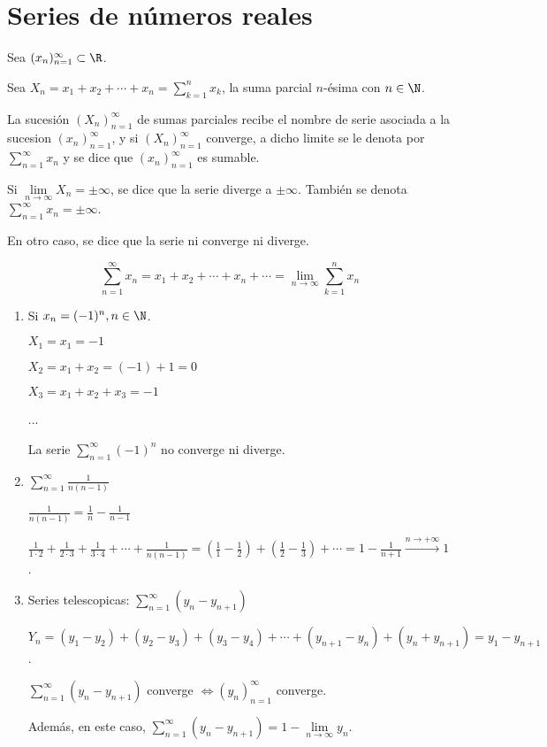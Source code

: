 \section{Series de números reales}
\begin{definition}[Serie]
	Sea \((x_n)^{\infty}_{n=1} \subset \R \). 
	
	Sea \(X_n = x_1 + x_2 + \cdots + x_n = \sum_{k =1}^{n } x_k \), la suma parcial \(n\)-ésima con \(n \in \N \).
	
	La sucesión \((X_n)^{\infty}_{n=1} \) de sumas parciales recibe el nombre de serie asociada a la sucesion \((x_n)^{\infty}_{n=1} \), y si \((X_n)^{\infty}_{n=1} \) converge, a dicho limite se le denota por \(\sum_{n =1}^{\infty} x_n \) y se dice que \((x_n)^{\infty}_{n=1} \) es sumable. 
	
	Si \(\lim\limits_{n \to \infty} X_n = \pm\infty \), se dice que la serie diverge a \(\pm\infty \). También se denota \(\sum_{n =1}^{\infty} x_n = \pm \infty \). 
	
	En otro caso, se dice que la serie ni converge ni diverge.
\end{definition}
\begin{remark}
	\[
		\sum_{n =1}^{\infty} x_n = x_1 + x_2 + \cdots + x_n + \cdots = \lim\limits_{n \to \infty} \sum_{k =1}^{n } x_n
	\]
\end{remark}
\begin{example}
	\begin{enumerate}
		\item Si \(x_n = (-1)^{n }, n \in \N \).
		      
		      \(X_1 = x_1 = -1 \)
		      
		      \(X_2 = x_1 + x_2 = (-1) + 1 = 0 \)
		      
		      \(X_3 = x_1 + x_2 + x_3 = -1 \)
		      
		      ...
		      
		      La serie \(\sum_{n =1}^{\infty} (-1)^{n} \) no converge ni diverge.
		\item \(\sum_{n =1}^{\infty} \frac{1 }{n(n-1)}\)
		      
		      \(\frac{1}{n(n-1)} = \frac{1}{n } - \frac{1}{n-1 }\)
		      
		      \(\frac{1}{1 \cdot 2 } + \frac{1}{2 \cdot 3 } + \frac{1}{3 \cdot 4 } + \cdots + \frac{1}{n(n-1)} = (\frac{1}{1} - \frac{1}{2}) + ( \frac{1}{2} - \frac{1}{3}) + \cdots = 1 - \frac{1}{n + 1} \overset{n \to +\infty}{\longrightarrow} 1\).
		\item Series telescopicas: \(\sum_{n =1}^{\infty} (y_n - y_{n+1})\)
		      
		      \(Y_n = (y_1 - y_2) + (y_2 - y_3) + (y_3 - y_4) + \cdots + (y_{n+1} - y_n) + (y_n + y_{n+1}) = y_1 - y_{n+1}\).
		      
		      \(\sum_{n =1}^{\infty} (y_n - y_{n+1})\) converge \(\iff (y_n)^{\infty}_{n=1} \) converge.
		      
		      Además, en este caso, \(\sum_{n =1}^{\infty} (y_n - y_{n+1}) = 1 - \lim\limits_{n \to \infty} y_n \).
	\end{enumerate}
\end{example}
